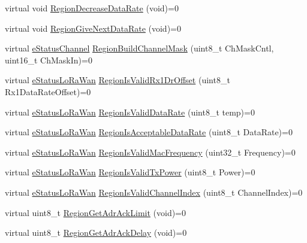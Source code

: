 \begin{DoxyCompactItemize}
virtual void \mbox{\hyperlink{class_lora_wan_container_a198e46f5b6358987f6ec0b91fdc8eab9}{Region\+Decrease\+Data\+Rate}} (void)=0
\item 
virtual void \mbox{\hyperlink{class_lora_wan_container_a32179d92bac6a7daea1bd39e84dec2a6}{Region\+Give\+Next\+Data\+Rate}} (void)=0
\item 
virtual \mbox{\hyperlink{_define_8h_abbfbf157098d2505c0cf33877b128cc9}{e\+Status\+Channel}} \mbox{\hyperlink{class_lora_wan_container_a7f0fbbcc4652885003a1db83aa28e507}{Region\+Build\+Channel\+Mask}} (uint8\+\_\+t Ch\+Mask\+Cntl, uint16\+\_\+t Ch\+Mask\+In)=0
\item 
virtual \mbox{\hyperlink{_define_8h_a1cea710adbbf5b02bced8f79cd82f7b9}{e\+Status\+Lo\+Ra\+Wan}} \mbox{\hyperlink{class_lora_wan_container_ac5d3abcc857b6b1f0535e12915dd2bfb}{Region\+Is\+Valid\+Rx1\+Dr\+Offset}} (uint8\+\_\+t Rx1\+Data\+Rate\+Offset)=0
\item 
virtual \mbox{\hyperlink{_define_8h_a1cea710adbbf5b02bced8f79cd82f7b9}{e\+Status\+Lo\+Ra\+Wan}} \mbox{\hyperlink{class_lora_wan_container_aeec0ea6c3979df30b2d9b27bdb8ea043}{Region\+Is\+Valid\+Data\+Rate}} (uint8\+\_\+t temp)=0
\item 
virtual \mbox{\hyperlink{_define_8h_a1cea710adbbf5b02bced8f79cd82f7b9}{e\+Status\+Lo\+Ra\+Wan}} \mbox{\hyperlink{class_lora_wan_container_a8316ea2c314c3809fa7c6b8e72e25df0}{Region\+Is\+Acceptable\+Data\+Rate}} (uint8\+\_\+t Data\+Rate)=0
\item 
virtual \mbox{\hyperlink{_define_8h_a1cea710adbbf5b02bced8f79cd82f7b9}{e\+Status\+Lo\+Ra\+Wan}} \mbox{\hyperlink{class_lora_wan_container_a14be092c3440b0bbfe9683f14c648eb2}{Region\+Is\+Valid\+Mac\+Frequency}} (uint32\+\_\+t Frequency)=0
\item 
virtual \mbox{\hyperlink{_define_8h_a1cea710adbbf5b02bced8f79cd82f7b9}{e\+Status\+Lo\+Ra\+Wan}} \mbox{\hyperlink{class_lora_wan_container_a481b6761bc4743086db57fb0adfb4d88}{Region\+Is\+Valid\+Tx\+Power}} (uint8\+\_\+t Power)=0
\item 
virtual \mbox{\hyperlink{_define_8h_a1cea710adbbf5b02bced8f79cd82f7b9}{e\+Status\+Lo\+Ra\+Wan}} \mbox{\hyperlink{class_lora_wan_container_a2eea298e891240d3367f2405b852964a}{Region\+Is\+Valid\+Channel\+Index}} (uint8\+\_\+t Channel\+Index)=0
\item 
virtual uint8\+\_\+t \mbox{\hyperlink{class_lora_wan_container_ab68ac169b3edd9aacc7a9c40976dc231}{Region\+Get\+Adr\+Ack\+Limit}} (void)=0
\item 
virtual uint8\+\_\+t \mbox{\hyperlink{class_lora_wan_container_ad90b5c47b794730a1027a548f20fd63c}{Region\+Get\+Adr\+Ack\+Delay}} (void)=0
\end{DoxyCompactItemize}
